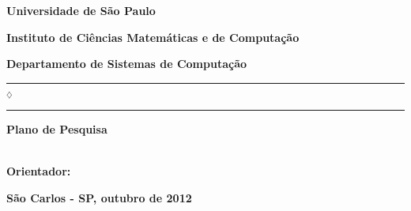 \thispagestyle{empty}

\begin{center}
\normalfont\sffamily

\begin{minipage}[c]{\textwidth}
  \parbox[c]{\textwidth}
    {      \begin{center}
      \textbf{\Large Universidade de São Paulo}

      \vspace{0.07cm}

      \textbf{\large Instituto de Ciências Matemáticas e de Computação}

      \vspace{0.07cm}

      \textbf{\large Departamento de Sistemas de Computação}
      \end{center}
    }
\end{minipage}

\vspace{-0.5cm}
\rule{7.5cm}{0.03pc}{\tiny $_\diamondsuit$}\rule{7.5cm}{0.03pc}

\end{center}

\begin{center}

\normalfont
\sffamily

\vspace*{20ex}

\textbf{\Large Plano de Pesquisa}\\

\vspace*{28ex}

\textbf{\Large \@title}


\vspace*{28ex}

\normalfont\sffamily

\textbf{\large \@author} \\
\vspace*{2ex}
\textbf{\large Orientador: \@advisor} \\

\vspace*{20ex}

\textbf{\large São Carlos - SP, outubro de 2012}


\end{center}

